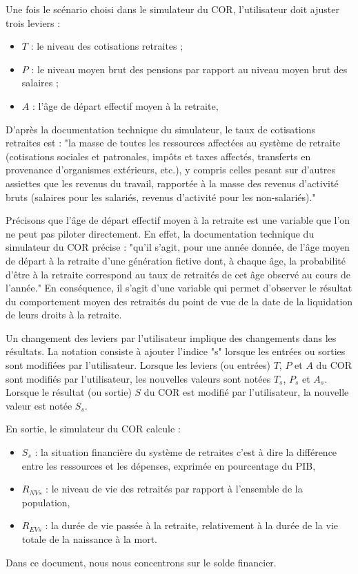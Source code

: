 \documentclass[10pt]{article}
\begin{document}
Une fois le scénario choisi dans le simulateur du COR, 
l'utilisateur doit ajuster trois leviers : 
\begin{itemize}
\item $T$ : le niveau des cotisations retraites ;
\item $P$ : le niveau moyen brut des pensions par rapport au niveau moyen brut des salaires ;
\item $A$ : l'âge de départ effectif moyen à la retraite, 
\end{itemize}

D'après la documentation technique du simulateur, 
le taux de cotisations retraites est : "la masse de toutes les ressources affectées au système
de retraite (cotisations sociales et patronales, impôts et taxes affectés, transferts en provenance
d’organismes extérieurs, etc.), y compris celles pesant sur d’autres assiettes 
que les revenus du travail, rapportée à la masse des revenus d'activité bruts (salaires pour les salariés, revenus d’activité pour les non-salariés)." 

Précisons que l'âge de départ effectif moyen à la retraite est une variable que l'on ne peut pas 
piloter directement. 
En effet, la documentation technique du simulateur du COR précise : "qu'il s’agit, 
pour une année donnée, de l’âge moyen 
de départ à la retraite d’une génération fictive dont, à chaque âge, 
la probabilité d’être à la retraite correspond au taux de retraités de cet âge observé 
au cours de l’année." 
En conséquence, il s'agit d'une variable qui permet d'observer le résultat du comportement 
moyen des retraités du point de vue de la date de la liquidation de leurs droits à la 
retraite. 

Un changement des leviers par l'utilisateur implique des changements 
dans les résultats. 
La notation consiste à ajouter l'indice "s" lorsque les entrées ou sorties 
sont modifiées par l'utilisateur. 
Lorsque les leviers (ou entrées) $T$, $P$ et $A$ du COR sont modifiés par l'utilisateur, les nouvelles valeurs sont notées $T_s$, $P_s$ et $A_s$. 
Lorsque le résultat (ou sortie) $S$ du COR est modifié par l'utilisateur, 
la nouvelle valeur est notée $S_s$.

En sortie, le simulateur du COR calcule :
\begin{itemize}
\item $S_s$ : la situation financière du système de retraites c'est à dire la différence 
entre les ressources et les dépenses, exprimée en pourcentage du PIB, 
\item $R_{NVs}$ : le niveau de vie des retraités par rapport à l’ensemble de la population, 
\item $R_{EVs}$ : la durée de vie passée à la retraite, relativement à la durée de la vie totale 
de la naissance à la mort. 
\end{itemize}
Dans ce document, nous nous concentrons sur le solde financier. 
\end{document}
